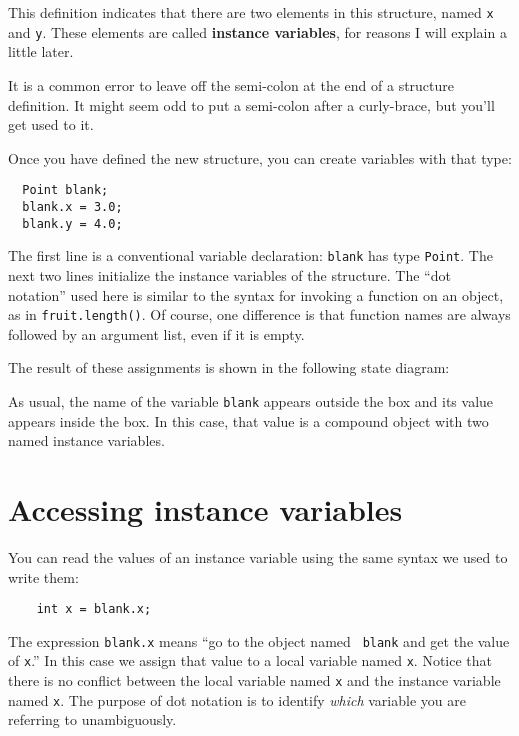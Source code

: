 This definition indicates that there are two elements in this
structure, named {\tt x} and {\tt y}.  These elements are called
{\bf instance variables}, for reasons I will explain a little
later.

It is a common error to leave off the semi-colon at the end of a
structure definition.  It might seem odd to put a semi-colon after a
curly-brace, but you'll get used to it.

Once you have defined the new structure, you can create variables
with that type:

\begin{verbatim}
  Point blank;
  blank.x = 3.0;
  blank.y = 4.0;   
\end{verbatim}
%
The first line is a conventional variable declaration: {\tt blank} has
type {\tt Point}.  The next two lines initialize the instance variables of the
structure.  The ``dot notation'' used here is similar to the syntax
for invoking a function on an object, as in {\tt fruit.length()}.
Of course, one difference is that function names are always followed
by an argument list, even if it is empty.


The result of these assignments is shown in the following
state diagram:

\vspace{0.1in}
\centerline{}
\vspace{0.1in}

As usual, the name of the variable {\tt blank} appears outside the box
and its value appears inside the box.  In this case, that value is
a compound object with two named instance variables.

\section{Accessing instance variables}

You can read the values of an instance variable using the same syntax we
used to write them:

\begin{verbatim}
    int x = blank.x;
\end{verbatim}
%
The expression {\tt blank.x} means ``go to the object named {\tt
blank} and get the value of {\tt x}.''  In this case we assign that
value to a local variable named {\tt x}.  Notice that there is no
conflict between the local variable named {\tt x} and the instance
variable named {\tt x}.  The purpose of dot notation is to identify
{\em which} variable you are referring to unambiguously.

